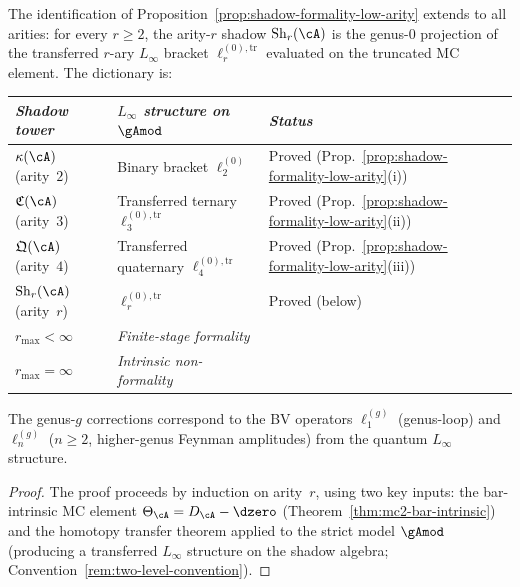 \begin{theorem}
\label{thm:shadow-formality-identification}
\ClaimStatusProvedHere
{}
The identification of
Proposition~\textup{\ref{prop:shadow-formality-low-arity}}
extends to all arities: for every $r \geq 2$,
the arity-$r$ shadow $\operatorname{Sh}_r(\cA)$ is the
genus-$0$ projection of the transferred $r$-ary
$L_\infty$ bracket $\ell_r^{(0),\mathrm{tr}}$
evaluated on the truncated MC element.
The dictionary is:
\begin{center}
\small
\renewcommand{\arraystretch}{1.15}
\begin{tabular}{lll}
\toprule
\emph{Shadow tower} &
\emph{$L_\infty$ structure on $\gAmod$} &
\emph{Status} \\
\midrule
$\kappa(\cA)$ \textup{(}arity~$2$\textup{)} &
  Binary bracket $\ell_2^{(0)}$ &
  Proved \textup{(}Prop.~\ref{prop:shadow-formality-low-arity}(i)\textup{)} \\
$\mathfrak{C}(\cA)$ \textup{(}arity~$3$\textup{)} &
  Transferred ternary $\ell_3^{(0),\mathrm{tr}}$ &
  Proved \textup{(}Prop.~\ref{prop:shadow-formality-low-arity}(ii)\textup{)} \\
$\mathfrak{Q}(\cA)$ \textup{(}arity~$4$\textup{)} &
  Transferred quaternary $\ell_4^{(0),\mathrm{tr}}$ &
  Proved \textup{(}Prop.~\ref{prop:shadow-formality-low-arity}(iii)\textup{)} \\
$\operatorname{Sh}_r(\cA)$ \textup{(}arity~$r$\textup{)} &
  $\ell_r^{(0),\mathrm{tr}}$ &
  Proved \textup{(}below\textup{)} \\[3pt]
\emph{$r_{\max} < \infty$} &
  \emph{Finite-stage formality} & \\
\emph{$r_{\max} = \infty$} &
  \emph{Intrinsic non-formality} & \\
\bottomrule
\end{tabular}
\end{center}
The genus-$g$ corrections correspond to the BV operators
$\ell_1^{(g)}$ (genus-loop) and $\ell_n^{(g)}$ ($n \geq 2$,
higher-genus Feynman amplitudes) from the quantum $L_\infty$
structure.

\begin{proof}
The proof proceeds by induction on arity~$r$, using two
key inputs: the bar-intrinsic MC element
$\Theta_\cA = D_\cA - \dzero$
(Theorem~\ref{thm:mc2-bar-intrinsic}) and the
homotopy transfer theorem applied to the strict model
$\gAmod$ (producing a transferred $L_\infty$ structure on the
shadow algebra; Convention~\ref{rem:two-level-convention}).


\end{proof}
\end{theorem}
